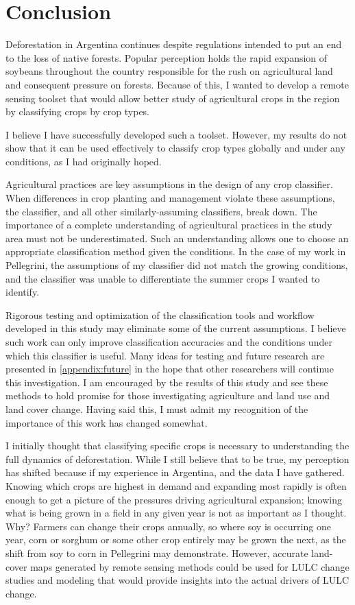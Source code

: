 \chapter{Conclusion}
\label{conclusion}

Deforestation in Argentina continues despite regulations intended to put an end to the loss of native forests. Popular perception holds the rapid expansion of soybeans throughout the country responsible for the rush on agricultural land and consequent pressure on forests. Because of this, I wanted to develop a remote sensing toolset that would allow better study of agricultural crops in the region by classifying crops by crop types.

I believe I have successfully developed such a toolset. However, my results do not show that it can be used effectively to classify crop types globally and under any conditions, as I had originally hoped.

Agricultural practices are key assumptions in the design of any crop classifier. When differences in crop planting and management violate these assumptions, the classifier, and all other similarly-assuming classifiers, break down. The importance of a complete understanding of agricultural practices in the study area must not be underestimated. Such an understanding allows one to choose an appropriate classification method given the conditions. In the case of my work in Pellegrini, the assumptions of my classifier did not match the growing conditions, and the classifier was unable to differentiate the summer crops I wanted to identify.

Rigorous testing and optimization of the classification tools and workflow developed in this study may eliminate some of the current assumptions. I believe such work can only improve classification accuracies and the conditions under which this classifier is useful.  Many ideas for testing and future research are presented in \autoref{appendix:future} in the hope that other researchers will continue this investigation. I am encouraged by the results of this study and see these methods to hold promise for those investigating agriculture and land use and land cover change. Having said this, I must admit my recognition of the importance of this work has changed somewhat.

I initially thought that classifying specific crops is necessary to understanding the full dynamics of deforestation. While I still believe that to be true, my perception has shifted because if my experience in Argentina, and the data I have gathered. Knowing which crops are highest in demand and expanding most rapidly is often enough to get a picture of the pressures driving agricultural expansion; knowing what is being grown in a field in any given year is not as important as I thought. Why? Farmers can change their crops annually, so where soy is occurring one year, corn or sorghum or some other crop entirely may be grown the next, as the shift from soy to corn in Pellegrini may demonstrate. However, accurate land-cover maps generated by remote sensing methods could be used for LULC change studies and modeling that would provide insights into the actual drivers of LULC change.

